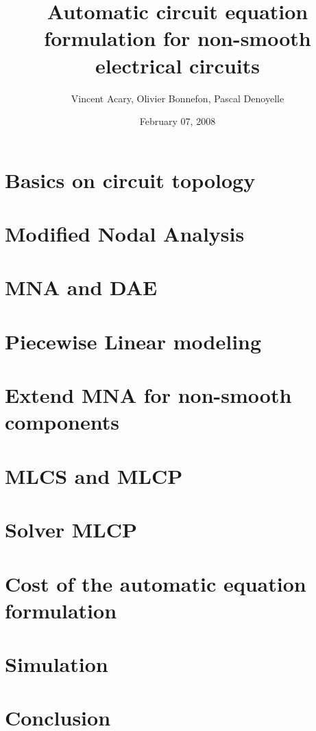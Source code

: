 \documentclass[8pt,xcolor*pst]{beamer}
\title{Automatic circuit equation formulation for non-smooth electrical circuits}
\author{Vincent Acary, Olivier Bonnefon, Pascal Denoyelle}
\date{February 07, 2008}
\institute{INRIA Rh\^one-Alpes}
\begin{document}
\frame{\titlepage}
\frame{\tableofcontents}%
\section{Basics on circuit topology}

\section{Modified Nodal Analysis}

\section{MNA and DAE}

\section{Piecewise Linear modeling}

\section{Extend MNA for non-smooth components}

\section{MLCS and MLCP}

\section{Solver MLCP}



\section{Cost of the automatic equation formulation}

\section{Simulation}

\section{Conclusion}



\def\newblock{}
\end{document}
